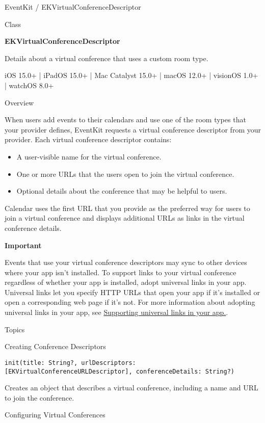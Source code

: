 \documentclass{article}
\title{}
\author{}
\date{}
\begin{document}
EventKit / EKVirtualConferenceDescriptor

Class

\textbf{EKVirtualConferenceDescriptor}

Details about a virtual conference that uses a custom room type.

iOS 15.0+ | iPadOS 15.0+ | Mac Catalyst 15.0+ | macOS 12.0+ | visionOS 1.0+ | watchOS 8.0+

\noindent{}

Overview

When users add events to their calendars and use one of the room types that your provider defines, EventKit requests a virtual conference descriptor from your provider. Each virtual conference descriptor contains:

\begin{itemize}
    \item A user-visible name for the virtual conference.
    \item One or more URLs that the users open to join the virtual conference.
    \item Optional details about the conference that may be helpful to users.
\end{itemize}

Calendar uses the first URL that you provide as the preferred way for users to join a virtual conference and displays additional URLs as links in the virtual conference details.

\textbf{Important}

Events that use your virtual conference descriptors may sync to other devices where your app isn't installed. To support links to your virtual conference regardless of whether your app is installed, adopt universal links in your app. Universal links let you specify HTTP URLs that open your app if it's installed or open a corresponding web page if it's not. For more information about adopting universal links in your app, see \href{Supporting universal links in your app.}{Supporting universal links in your app.}.

Topics

Creating Conference Descriptors

\texttt{init(title: String?, urlDescriptors: [EKVirtualConferenceURLDescriptor], conferenceDetails: String?)}

Creates an object that describes a virtual conference, including a name and URL to join the conference.

Configuring Virtual Conferences
\end{document}
